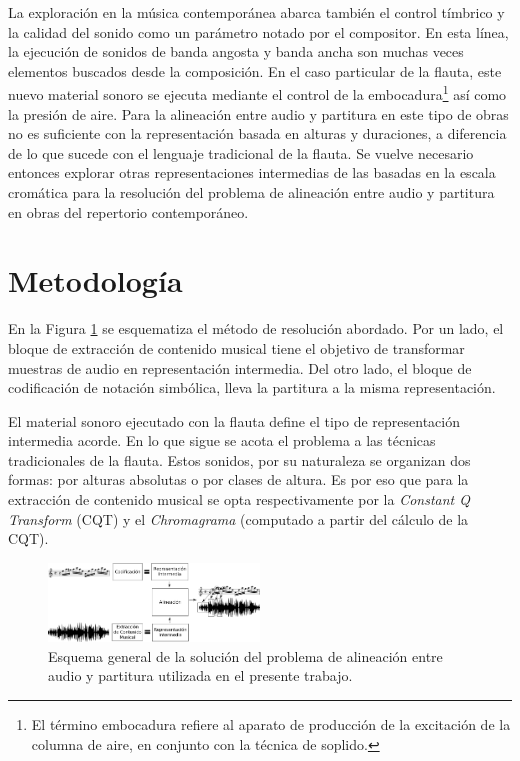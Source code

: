 \documentclass
  [ams,pdfout]%
	{aeslac}
\begin{document}
%
La exploración en la música contemporánea abarca también el control tímbrico y la calidad del sonido como un parámetro notado por el compositor. En esta línea, la ejecución de sonidos de banda angosta y banda ancha son muchas veces elementos buscados desde la composición. En el caso particular de la flauta, este nuevo material sonoro se ejecuta mediante el control de la embocadura\footnote{El término embocadura refiere al aparato de producción de la excitación de la columna de aire, en conjunto con la técnica de soplido.} así como la presión de aire. Para la alineación entre audio y partitura en este tipo de obras no es suficiente con la representación basada en alturas y duraciones, a diferencia de lo que sucede con el lenguaje tradicional de la flauta. Se vuelve necesario entonces explorar otras representaciones intermedias de las basadas en la escala cromática para la resolución del problema de alineación entre audio y partitura en obras del repertorio contemporáneo.      


\section{Metodología}

En la Figura \ref{fig:diagrama_general} se esquematiza el método de resolución abordado. Por un lado, el bloque de extracción de contenido musical tiene el objetivo de transformar muestras de audio en representación intermedia. Del otro lado, el bloque de codificación de notación simbólica, lleva la partitura a la misma representación. 

El material sonoro ejecutado con la flauta define el tipo de representación intermedia acorde. En lo que sigue se acota el problema a las técnicas tradicionales de la flauta. Estos sonidos, por su naturaleza se organizan dos formas: por alturas absolutas o por clases de altura. Es por eso que para la extracción de contenido musical se opta respectivamente por la \textit{Constant Q Transform}\cite{schorkhuber2010constant} (CQT) y el \textit{Chromagrama} (computado a partir del cálculo de la CQT).

\begin{figure}[h!]
\begin{center}
\includegraphics[width=0.5\textwidth]{imagenes/diagrama_general-back} 	
\caption{Esquema general de la solución del problema de alineación entre audio y partitura utilizada en el presente trabajo.}
\label{fig:diagrama_general}
\end{center}
\end{figure}
\end{document}
